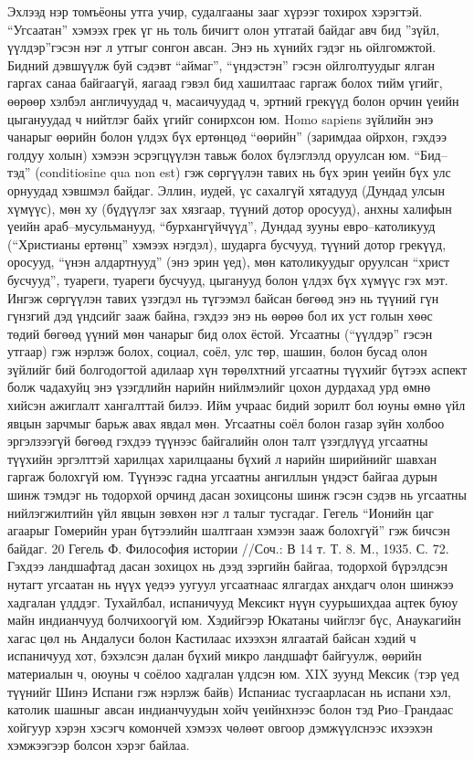 Эхлээд нэр томъёоны утга учир, судалгааны зааг хүрээг тохирох хэрэгтэй. “Угсаатан” хэмээх грек үг нь толь бичигт олон утгатай байдаг авч бид ”зүйл, үүлдэр”гэсэн нэг л утгыг сонгон авсан. Энэ нь хүнийх гэдэг нь ойлгомжтой. Бидний дэвшүүлж буй сэдэвт “аймаг”, “үндэстэн” гэсэн ойлголтуудыг ялган гаргах санаа байгаагүй, яагаад гэвэл бид хашилтаас гаргаж болох тийм үгийг, өөрөөр хэлбэл англичуудад ч, масаичуудад ч, эртний грекүүд болон орчин үеийн цыгануудад ч нийтлэг байх үгийг сонирхсон юм. Homo sapiens зүйлийн энэ чанарыг өөрийн болон үлдэх бүх ертөнцөд “өөрийн” (заримдаа ойрхон, гэхдээ голдуу холын) хэмээн эсрэгцүүлэн тавьж болох бүлэглэлд оруулсан юм. “Бид–тэд” (conditiosine qua non est) гэж сөргүүлэн тавих нь бүх эрин үеийн бүх улс орнуудад хэвшмэл байдаг. Эллин, иудей, үс сахалгүй хятадууд (Дундад улсын хүмүүс), мөн ху (бүдүүлэг зах хязгаар, түүний дотор оросууд), анхны халифын үеийн араб–мусульманууд, “бурхангүйчүүд”, Дундад зууны евро–католикууд (“Христианы ертөнц” хэмээх нэгдэл), шударга бусчууд, түүний дотор грекүүд, оросууд, “үнэн алдартнууд” (энэ эрин үед), мөн католикуудыг оруулсан “христ бусчууд”, туареги, туареги бусчууд, цыганууд болон үлдэх бүх хүмүүс гэх мэт. Ингэж сөргүүлэн тавих үзэгдэл нь түгээмэл байсан бөгөөд энэ нь түүний гүн гүнзгий дэд үндсийг зааж байна, гэхдээ энэ нь өөрөө бол их уст голын хөөс төдий бөгөөд үүний мөн чанарыг бид олох ёстой. Угсаатны (“үүлдэр” гэсэн утгаар) гэж нэрлэж болох, социал, соёл, улс төр, шашин, болон бусад олон зүйлийг бий болгодогтой адилаар хүн төрөлхтний угсаатны түүхийг бүтээх аспект болж чадахуйц энэ үзэгдлийн нарийн нийлмэлийг цохон дурдахад урд өмнө хийсэн ажиглалт хангалттай билээ. Ийм учраас бидий зорилт бол юуны өмнө үйл явцын зарчмыг барьж авах явдал мөн.
Угсаатны соёл болон газар зүйн холбоо эргэлзээгүй бөгөөд гэхдээ түүнээс байгалийн олон талт үзэгдлүүд угсаатны түүхийн эргэлттэй харилцах харилцааны бүхий л нарийн ширийнийг шавхан гаргаж болохгүй юм. Түүнээс гадна угсаатны ангиллын үндэст байгаа дурын шинж тэмдэг нь тодорхой орчинд дасан зохицсоны шинж гэсэн сэдэв нь угсаатны нийлэгжилтийн үйл явцын зөвхөн нэг л талыг тусгадаг. Гегель “Ионийн цаг агаарыг Гомерийн уран бүтээлийн шалтгаан хэмээн зааж болохгүй” гэж бичсэн байдаг.
20 Гегель Ф. Философия истории //Соч.: В 14 т. Т. 8. М., 1935. С. 72.
Гэхдээ ландшафтад дасан зохицох нь дээд зэргийн байгаа, тодорхой бүрэлдсэн нутагт угсаатан нь нүүх үедээ уугуул угсаатнаас ялгагдах анхдагч олон шинжээ хадгалан үлддэг. Тухайлбал, испаничууд Мексикт нүүн суурьшихдаа ацтек буюу майн индианчууд болчихоогүй юм. Хэдийгээр Юкатаны чийглэг бүс, Анаукагийн хагас цөл нь Андалуси болон Кастилаас ихээхэн ялгаатай байсан хэдий ч испаничууд хот, бэхэлсэн далан бүхий микро ландшафт байгуулж, өөрийн материалын ч, оюуны ч соёлоо хадгалан үлдсэн юм. XIX зуунд Мексик (тэр үед түүнийг Шинэ Испани гэж нэрлэж байв) Испаниас тусгаарласан нь испани хэл, католик шашныг авсан индианчуудын хойч үеийнхнээс болон тэд Рио–Грандаас хойгуур хэрэн хэсэгч комончей хэмээх чөлөөт овгоор дэмжүүлснээс ихээхэн хэмжээгээр болсон хэрэг байлаа.

